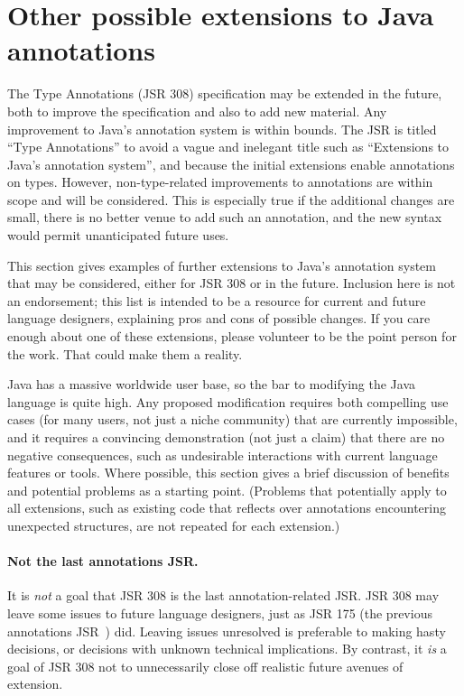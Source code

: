\documentclass[10pt]{article}
\begin{document}
\section{Other possible extensions to Java annotations\label{other-annotations}}

The Type Annotations (JSR 308) specification may be extended in the future,
both to improve the specification and also to add new material.
Any improvement to Java's annotation system is within bounds.  The JSR is
titled ``Type Annotations'' to avoid a vague and inelegant title such as
``Extensions to Java's annotation system'', and because the initial
extensions enable annotations on types.  However, non-type-related
improvements to annotations are within scope and will be considered.  This
is especially true if the additional changes are small, there is no better
venue to add such an annotation, and the new syntax would permit
unanticipated future uses.

This section gives examples of further extensions to Java's annotation
system that may be considered, either for JSR 308 or in the future.
Inclusion here is not an endorsement; this list is intended to be a
resource for current and future language designers, explaining pros and
cons of possible changes.
If you care enough about one of these extensions, please
volunteer to be the point person for the work.  That could make them a
reality.

Java has a massive worldwide user base, so the bar to modifying the Java
language is quite high.  Any proposed modification requires both compelling
use cases (for many users, not just a niche community) that are currently
impossible, and it requires a convincing demonstration (not just a claim)
that there are no negative consequences, such as undesirable interactions
with current language features or tools.  Where possible, this section
gives a brief discussion of benefits and potential problems as a starting
point.  (Problems that potentially apply to all extensions, such as
existing code that reflects over annotations encountering unexpected
structures, are not repeated for each extension.)


\paragraph{Not the last annotations JSR.}
It is \emph{not} a goal that JSR 308 is the last annotation-related JSR\@.
JSR 308 may leave some issues to future language designers, just as
JSR 175 (the previous annotations JSR~\cite{JSR175}) did.
Leaving issues unresolved is preferable to making hasty decisions, or
decisions with unknown technical implications.
By contrast, it \emph{is} a goal of JSR 308 not to unnecessarily close off
realistic future avenues of extension.
\end{document}
